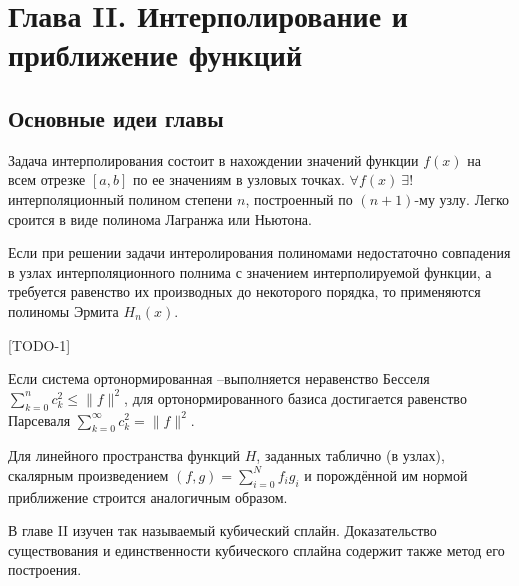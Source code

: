 \newpage
{}
\pagestyle{empty}
\vspace{0.5cm}

\section*{Глава II. Интерполирование и приближение функций}

\subsection{Основные идеи главы} 

Задача интерполирования состоит в нахождении значений функции $f(x)$
на всем отрезке $[a,b]$ по ее значениям в узловых точках. $\forall f(x)~\exists!$ интерполяционный полином степени $n$, построенный по $(n+1)$-му узлу. Легко сроится в виде полинома Лагранжа или Ньютона.

Если при решении задачи интеролирования полиномами недостаточно совпадения в узлах интерполяционного полнима с значением интерполируемой функции, а требуется равенство их производных до некоторого порядка, то применяются полиномы Эрмита $H_n (x)$.

[TODO-1]

Если система ортонормированная –выполняется неравенство Бесселя $\sum_{k=0}^n c_k^2 \leqslant \|f\|^2$, для ортонормированного базиса достигается равенство Парсеваля $\sum_{k=0}^\infty c_k^2 = \|f\|^2.$

Для линейного пространства функций $H$, заданных таблично (в узлах),  скалярным произведением $(f,g) = \sum\limits_{i=0}^N f_i g_i$ и порождённой им нормой приближение строится аналогичным образом.

В главе II изучен так называемый кубический сплайн. Доказательство существования и единственности кубического сплайна содержит также метод его построения.

